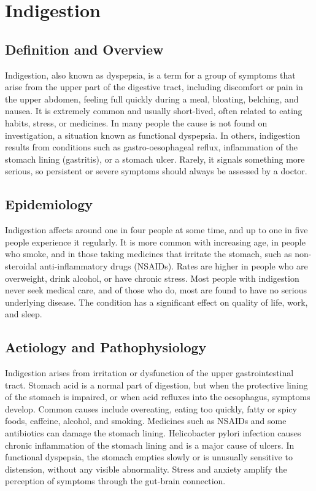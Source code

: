 \chapter{Indigestion}

\section*{Definition and Overview}
Indigestion, also known as dyspepsia, is a term for a group of symptoms that arise from the upper part of the digestive tract, including discomfort or pain in the upper abdomen, feeling full quickly during a meal, bloating, belching, and nausea. It is extremely common and usually short-lived, often related to eating habits, stress, or medicines. In many people the cause is not found on investigation, a situation known as functional dyspepsia. In others, indigestion results from conditions such as gastro-oesophageal reflux, inflammation of the stomach lining (gastritis), or a stomach ulcer. Rarely, it signals something more serious, so persistent or severe symptoms should always be assessed by a doctor.

\section*{Epidemiology}
Indigestion affects around one in four people at some time, and up to one in five people experience it regularly. It is more common with increasing age, in people who smoke, and in those taking medicines that irritate the stomach, such as non-steroidal anti-inflammatory drugs (NSAIDs). Rates are higher in people who are overweight, drink alcohol, or have chronic stress. Most people with indigestion never seek medical care, and of those who do, most are found to have no serious underlying disease. The condition has a significant effect on quality of life, work, and sleep.

\section*{Aetiology and Pathophysiology}
Indigestion arises from irritation or dysfunction of the upper gastrointestinal tract. Stomach acid is a normal part of digestion, but when the protective lining of the stomach is impaired, or when acid refluxes into the oesophagus, symptoms develop. Common causes include overeating, eating too quickly, fatty or spicy foods, caffeine, alcohol, and smoking. Medicines such as NSAIDs and some antibiotics can damage the stomach lining. Helicobacter pylori infection causes chronic inflammation of the stomach lining and is a major cause of ulcers. In functional dyspepsia, the stomach empties slowly or is unusually sensitive to distension, without any visible abnormality. Stress and anxiety amplify the perception of symptoms through the gut-brain connection.

